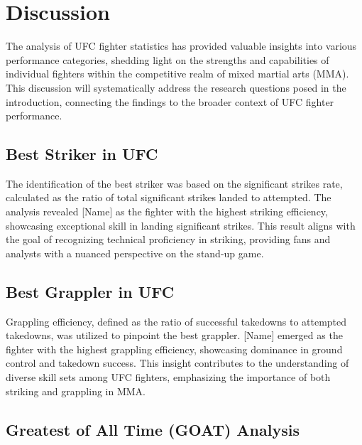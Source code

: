 \documentclass[
  man,floatsintext]{apa6}
\begin{document}
\hypertarget{discussion}{%
\section{Discussion}\label{discussion}}

The analysis of UFC fighter statistics has provided valuable insights into various performance categories, shedding light on the strengths and capabilities of individual fighters within the competitive realm of mixed martial arts (MMA). This discussion will systematically address the research questions posed in the introduction, connecting the findings to the broader context of UFC fighter performance.

\hypertarget{best-striker-in-ufc}{%
\subsection{Best Striker in UFC}\label{best-striker-in-ufc}}

The identification of the best striker was based on the significant strikes rate, calculated as the ratio of total significant strikes landed to attempted. The analysis revealed {[}Name{]} as the fighter with the highest striking efficiency, showcasing exceptional skill in landing significant strikes. This result aligns with the goal of recognizing technical proficiency in striking, providing fans and analysts with a nuanced perspective on the stand-up game.

\hypertarget{best-grappler-in-ufc}{%
\subsection{Best Grappler in UFC}\label{best-grappler-in-ufc}}

Grappling efficiency, defined as the ratio of successful takedowns to attempted takedowns, was utilized to pinpoint the best grappler. {[}Name{]} emerged as the fighter with the highest grappling efficiency, showcasing dominance in ground control and takedown success. This insight contributes to the understanding of diverse skill sets among UFC fighters, emphasizing the importance of both striking and grappling in MMA.

\hypertarget{greatest-of-all-time-goat-analysis}{%
\subsection{Greatest of All Time (GOAT) Analysis}\label{greatest-of-all-time-goat-analysis}}
\end{document}
